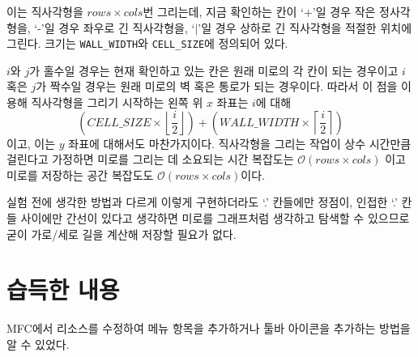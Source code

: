 이는 직사각형을 $rows \times cols$번 그리는데, 지금 확인하는 칸이 `+'일 경우 작은 정사각형을, `-'일 경우 좌우로 긴 직사각형을, `$|$'일 경우 상하로
긴 직사각형을 적절한 위치에 그린다. 크기는 \texttt{WALL_WIDTH}와 \texttt{CELL_SIZE}에 정의되어 있다.

$i$와 $j$가 홀수일 경우는 현재 확인하고 있는 칸은 원래 미로의 각 칸이 되는 경우이고 $i$ 혹은 $j$가 짝수일 경우는 원래 미로의 벽 혹은 통로가 되는 경우이다.
따라서 이 점을 이용해 직사각형을 그리기 시작하는 왼쪽 위 $x$ 좌표는 $i$에 대해
\[\left(CELL\_SIZE \times \left\lfloor\frac{i}{2}\right\rfloor\right) + \left(WALL\_WIDTH \times \left\lceil\frac{i}{2}\right\rceil\right)\]
이고, 이는 $y$ 좌표에 대해서도 마찬가지이다. 직사각형을 그리는 작업이 상수 시간만큼 걸린다고 가정하면 미로를 그리는 데 소요되는 시간 복잡도는 $\mathcal{O}\left(rows \times cols\right)$
이고 미로를 저장하는 공간 복잡도도 $\mathcal{O}\left(rows \times cols\right)$이다.

실험 전에 생각한 방법과 다르게 이렇게 구현하더라도 `.' 칸들에만 정점이, 인접한 `.' 칸들 사이에만 간선이 있다고 생각하면
미로를 그래프처럼 생각하고 탐색할 수 있으므로 굳이 가로/세로 길을 계산해 저장할 필요가 없다.

\section{습득한 내용}
MFC에서 리소스를 수정하여 메뉴 항목을 추가하거나 툴바 아이콘을 추가하는 방법을 알 수 있었다.


